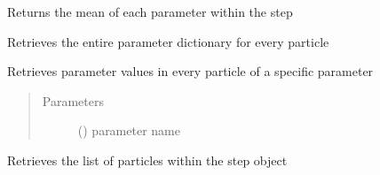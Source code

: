 \documentclass[letterpaper,10pt,english]{sphinxmanual}
\begin{document}
\begin{fulllineitems}
\begin{fulllineitems}
\end{fulllineitems}


\begin{fulllineitems}
\label{\detokenize{source_code:smcpy.smc.smc_step.SMCStep.get_mean}}
Returns the mean of each parameter within the step

\end{fulllineitems}


\begin{fulllineitems}
\label{\detokenize{source_code:smcpy.smc.smc_step.SMCStep.get_param_dicts}}
Retrieves the entire parameter dictionary for every particle

\end{fulllineitems}


\begin{fulllineitems}
\label{\detokenize{source_code:smcpy.smc.smc_step.SMCStep.get_params}}
Retrieves parameter values in every particle of a specific parameter
\begin{quote}\begin{description}
\item[{Parameters}] \leavevmode
{} () \textendash{} parameter name

\end{description}\end{quote}

\end{fulllineitems}


\begin{fulllineitems}
\label{\detokenize{source_code:smcpy.smc.smc_step.SMCStep.get_particles}}
Retrieves the list of particles within the step object


\end{fulllineitems}
\end{fulllineitems}
\end{document}
